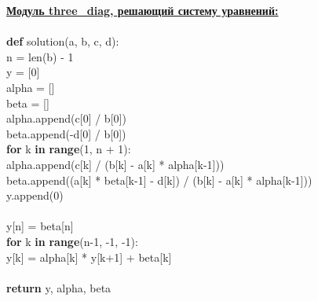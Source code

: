 \documentclass[a4paper,12pt]{report}
\begin{document}
\bigskip

\underline{\bf Модуль three\_diag, решающий систему уравнений:} \\
\\
\noindent
{\bf def} solution(a, b, c, d): \\
\hspace*{2em}    n = len(b) - 1 \\
\hspace*{2em}    y = [0] \\
\hspace*{2em}    alpha = [] \\
\hspace*{2em}    beta = [] \\
\hspace*{2em}    alpha.append(c[0] / b[0]) \\
\hspace*{2em}    beta.append(-d[0] / b[0]) \\
\hspace*{2em}    {\bf for} k {\bf in} {\bf range}(1, n + 1): \\
\hspace*{4em}    alpha.append(c[k] / (b[k] - a[k] * alpha[k-1])) \\
\hspace*{4em}    beta.append((a[k] * beta[k-1] - d[k]) / (b[k] - a[k] * alpha[k-1])) \\
\hspace*{4em}    y.append(0) \\
\\
\hspace*{2em}    y[n] = beta[n] \\
\hspace*{2em}    {\bf for} k {\bf in} {\bf range}(n-1, -1, -1): \\
\hspace*{4em}         y[k] = alpha[k] * y[k+1] + beta[k] \\
 \\
\hspace*{2em}    {\bf return} y, alpha, beta\\

\newpage
\end{document}
